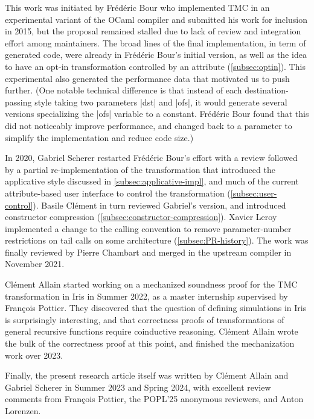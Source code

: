 \begin{acks}
  This work was initiated by Frédéric Bour who implemented TMC in an
  experimental variant of the OCaml compiler and submitted his work
  for inclusion in 2015, but the proposal remained stalled due to lack
  of review and integration effort among maintainers. The broad lines
  of the final implementation, in term of generated code, were already
  in Frédéric Bour's initial version, as well as the idea to have an
  opt-in transformation controlled by an attribute
  (\cref{subsec:optin}). This experimental also generated the
  performance data that motivated us to push further. (One notable
  technical difference is that instead of each destination-passing
  style taking two parameters \ocaml|dst| and |ofs|, it would generate
  several versions specializing the \ocaml|ofs| variable to
  a constant. Frédéric Bour found that this did not noticeably improve
  performance, and changed back to a parameter to simplify the
  implementation and reduce code size.)
  
  In 2020, Gabriel Scherer restarted Frédéric Bour's effort with
  a review followed by a partial re-implementation of the
  transformation that introduced the applicative style discussed in
  \cref{subsec:applicative-impl}, and much of the current
  attribute-based user interface to control the transformation
  (\cref{subsec:user-control}). Basile Clément in turn reviewed
  Gabriel's version, and introduced constructor compression
  (\cref{subsec:constructor-compression}). Xavier Leroy implemented
  a change to the \OCaml calling convention to remove parameter-number
  restrictions on tail calls on some architecture
  (\cref{subsec:PR-history}). The work was finally reviewed by Pierre
  Chambart and merged in the upstream \OCaml compiler in November
  2021.

  Clément Allain started working on a mechanized soundness proof for
  the TMC transformation in Iris in Summer 2022, as a master
  internship supervised by François Pottier. They discovered that the
  question of defining simulations in Iris is surprisingly
  interesting, and that correctness proofs of transformations of
  general recursive functions require coinductive reasoning. Clément
  Allain wrote the bulk of the correctness proof at this point, and
  finished the mechanization work over 2023.

  Finally, the present research article itself was written by Clément
  Allain and Gabriel Scherer in Summer 2023 and Spring 2024, with
  excellent review comments from François Pottier, the POPL'25
  anonymous reviewers, and Anton Lorenzen.
\end{acks}

